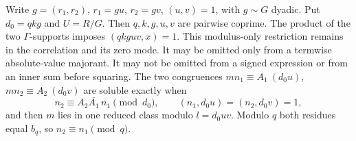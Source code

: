 Write $g=(r_1,r_2)$, $r_1=gu$, $r_2=gv$, $(u,v)=1$, with $g\sim G$ dyadic.
Put $d_0=qkg$ and $U=R/G$. Then $q,k,g,u,v$ are pairwise coprime.
The product of the two $\Gamma$-supports imposes
$(qkguv,x)=1$. This modulus-only restriction remains in the
correlation and its zero mode. It may be omitted only from a
termwise absolute-value majorant. It may not be omitted from a signed expression
or from an inner sum before squaring. The two congruences
$mn_1\equiv A_1\ (d_0u)$, $mn_2\equiv A_2\ (d_0v)$ are
soluble exactly when
\begin{equation}\label{sp:comp}
 n_2\equiv A_2\overline{A_1}\,n_1\pmod{d_0},\qquad(n_1,d_0u)=(n_2,d_0v)=1,
\end{equation}
and then $m$ lies in one reduced class modulo $l=d_0uv$. Modulo $q$ both
residues equal $b_q$, so $n_2\equiv n_1\pmod q$.

